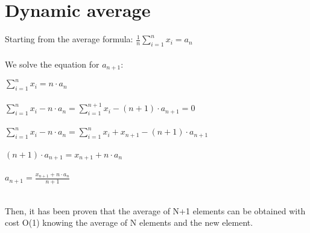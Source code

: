 %
%
%

\chapter{Dynamic average}

\label{app:average}

Starting from the average formula:
$ {\displaystyle \frac1n\sum_{i=1}^{n}x_i=a_n} $\\\\

\noindent
We solve the equation for $a_{n+1}$:

\noindent
$ {\displaystyle \sum_{i=1}^{n}x_i=n\cdot a_n} $\\\\
\noindent
$ {\displaystyle \sum_{i=1}^{n}x_i-n\cdot a_n=\sum_{i=1}^{n+1}x_i-(n+1)\cdot a_{n+1}=0} $\\\\
\noindent
$ {\displaystyle \sum_{i=1}^{n}x_i-n\cdot a_n=\sum_{i=1}^{n}x_i+x_{n+1}-(n+1)\cdot a_{n+1}} $\\\\
\noindent
$ {\displaystyle (n+1)\cdot a_{n+1}=x_{n+1}+n\cdot a_n} $\\\\
\noindent
$ {\displaystyle a_{n+1}=\frac{x_{n+1}+n\cdot a_n}{n+1}} $\\\\

\vspace{5mm}

Then, it has been proven that the average of N+1 elements can be obtained with cost O(1) knowing the average of N elements and the new element.
